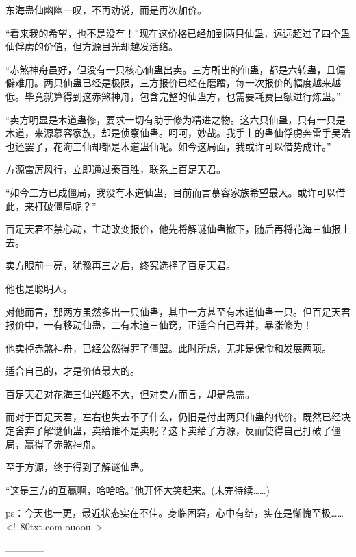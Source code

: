 \begin{this_body}
东海蛊仙幽幽一叹，不再劝说，而是再次加价。

“看来我的希望，也不是没有！”现在这价格已经加到两只仙蛊，远远超过了四个蛊仙俘虏的价值，但方源目光却越发活络。

“赤煞神舟虽好，但没有一只核心仙蛊出卖。三方所出的仙蛊，都是六转蛊，且偏僻难用。两只仙蛊已经是极限，三方报价已经在磨蹭，每一次报价的幅度越来越低。毕竟就算得到这赤煞神舟，包含完整的仙蛊方，也需要耗费巨额进行炼蛊。”

“卖方明显是木道蛊修，要求一切有助于修为精进之物。这六只仙蛊，只有一只是木道，来源慕容家族，却是侦察仙蛊。呵呵，妙哉。我手上的蛊仙俘虏奔雷手吴浩也还罢了，花海三仙却都是木道蛊仙呢。如今这局面，我或许可以借势成计。”

方源雷厉风行，立即通过秦百胜，联系上百足天君。

“如今三方已成僵局，我没有木道仙蛊，目前而言慕容家族希望最大。或许可以借此，来打破僵局呢？”

百足天君不禁心动，主动改变报价，他先将解谜仙蛊撤下，随后再将花海三仙报上去。

卖方眼前一亮，犹豫再三之后，终究选择了百足天君。

他也是聪明人。

对他而言，那两方虽然多出一只仙蛊，其中一方甚至有木道仙蛊一只。但百足天君报价中，一有移动仙蛊，二有木道三仙窍，正适合自己吞并，暴涨修为！

他卖掉赤煞神舟，已经公然得罪了僵盟。此时所虑，无非是保命和发展两项。

适合自己的，才是价值最大的。

百足天君对花海三仙兴趣不大，但对卖方而言，却是急需。

而对于百足天君，左右也失去不了什么，仍旧是付出两只仙蛊的代价。既然已经决定舍弃了解谜仙蛊，卖给谁不是卖呢？这下卖给了方源，反而使得自己打破了僵局，赢得了赤煞神舟。

至于方源，终于得到了解谜仙蛊。

“这是三方的互赢啊，哈哈哈。”他开怀大笑起来。(未完待续……)

ps：今天也一更，最近状态实在不佳。身临困窘，心中有结，实在是惭愧至极……<!--80txt.com-ouoou-->

------------

\end{this_body}


